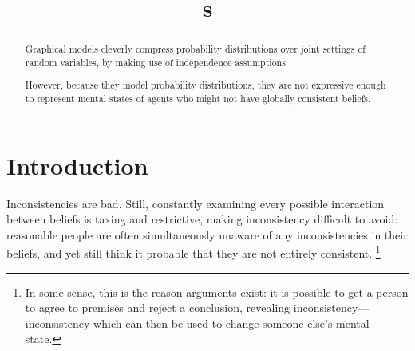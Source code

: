 \documentclass{article}
\title{\ModelName s}
\author{} %
\newcommand\changed[1]{{\color{note-fg} #1}}
\newcommand{\modelname}{probabilistic dependency graph}
\newcommand{\modelnames}{\modelname s}
\newcommand{\MN}{PDG}
\newcommand{\MNs}{\MN s}
\begin{document}
	\maketitle

	\begin{abstract}
		Graphical models cleverly compress probability distributions over joint settings of random variables, by making use of independence assumptions.
		
		However, because they model probability distributions, they are not expressive enough to represent mental states of agents who might not have globally consistent beliefs. 
			
		
	\end{abstract}


	\section{Introduction}

	Inconsistencies are bad. \changed{Still, constantly examining every possible interaction between beliefs is taxing and restrictive, making inconsistency} difficult to avoid: reasonable people are often simultaneously unaware of any inconsistencies in their beliefs, and yet still think it probable that they are not entirely consistent.%
		\footnote{In some sense, this is the reason arguments exist: it is possible to get a person to agree to premises and reject a conclusion, revealing inconsistency---inconsistency which can then be used to change someone else's mental state. }
\end{document}
